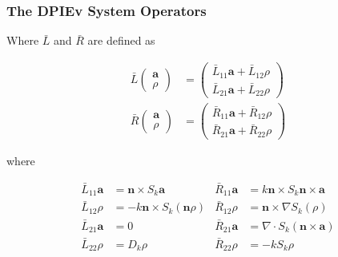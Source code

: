 \documentclass{beamer}
\newcommand{\bvec}[1]{\boldsymbol{#1}}
\begin{document}
	\appendix
	\begin{frame}
	\frametitle{The DPIEv System Operators} \label{s:dpievop}
	Where $\bar{L}$ and $\bar{R}$ are defined as 
	
	\begin{align*}
	\bar{L}\begin{pmatrix}
	\bvec{a} \\
	\rho
	\end{pmatrix}&= \begin{pmatrix}
	\bar{L}_{11} \bvec{a} + \bar{L}_{12} \rho \\
	\bar{L}_{21} \bvec{a} + \bar{L}_{22} \rho
	\end{pmatrix} \\
	\bar{R} \begin{pmatrix}
	\bvec{a} \\
	\rho
	\end{pmatrix}  &= \begin{pmatrix}
	\bar{R}_{11} \bvec{a} + \bar{R}_{12} \rho \\
	\bar{R}_{21} \bvec{a} + \bar{R}_{22} \rho
	\end{pmatrix}
	\end{align*}
	
	where
	
	\begin{align*}
	\bar{L}_{11} \bvec{a} &= \bvec{n} \times S_k \bvec{a} & \bar{R}_{11} \bvec{a} &= k \bvec{n} \times S_k \bvec{n} \times \bvec{a}\\
	\bar{L}_{12} \rho &= - k \bvec{n} \times S_k\left(\bvec{n} \rho \right) & \bar{R}_{12} \rho &= \bvec{n} \times \nabla S_k\left( \rho \right)\\
	\bar{L}_{21} \bvec{a} &= 0 & \bar{R}_{21} \bvec{a} &= \nabla \cdot S_k \left(\bvec{n} \times \bvec{a}\right) \\
	\bar{L}_{22} \rho &= D_k \rho & \bar{R}_{22} \rho &= - k S_k \rho
	\end{align*}
		
	\end{frame}
\end{document}
